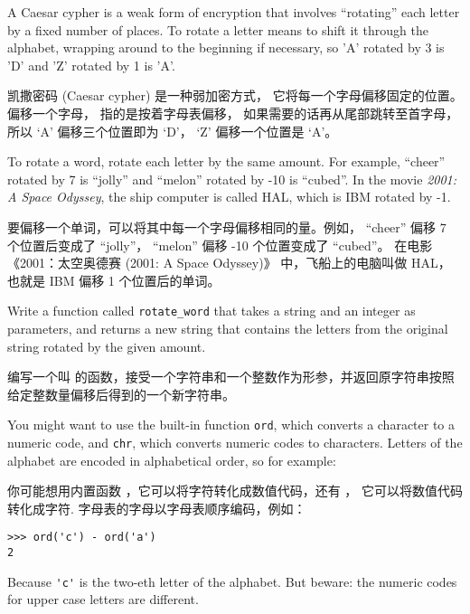 \begin{exercise}
  

\label{exrotate}
A Caesar cypher is a weak form of encryption that involves ``rotating'' each
letter by a fixed number of places.  To rotate a letter means
to shift it through the alphabet, wrapping around to the beginning if
necessary, so 'A' rotated by 3 is 'D' and 'Z' rotated by 1 is 'A'.

凯撒密码 (Caesar cypher) 是一种弱加密方式， 它将每一个字母偏移固定的位置。 偏移一个字母， 指的是按着字母表偏移， 如果需要的话再从尾部跳转至首字母， 所以 `A' 偏移三个位置即为 `D'， `Z' 偏移一个位置是 `A'。

To rotate a word, rotate each letter by the same amount.
For example, ``cheer'' rotated by 7 is ``jolly'' and ``melon'' rotated
by -10 is ``cubed''.  In the movie {\em 2001: A Space Odyssey}, the
ship computer is called HAL, which is IBM rotated by -1.

要偏移一个单词，可以将其中每一个字母偏移相同的量。例如， ``cheer'' 偏移 7 个位置后变成了 ``jolly''， ``melon'' 偏移 -10 个位置变成了 ``cubed''。 在电影 《2001：太空奥德赛 (2001: A Space Odyssey)》 中，飞船上的电脑叫做 HAL，也就是 IBM 偏移 1 个位置后的单词。


Write a function called \verb"rotate_word"
that takes a string and an integer as parameters, and returns
a new string that contains the letters from the original string
rotated by the given amount.

编写一个叫  的函数，接受一个字符串和一个整数作为形参，并返回原字符串按照给定整数量偏移后得到的一个新字符串。

You might want to use the built-in function {\tt ord}, which converts
a character to a numeric code, and {\tt chr}, which converts numeric
codes to characters.  Letters of the alphabet are encoded in alphabetical
order, so for example:

你可能想用内置函数  ，它可以将字符转化成数值代码，还有 ， 它可以将数值代码转化成字符. 字母表的字母以字母表顺序编码，例如：

\begin{lstlisting}
>>> ord('c') - ord('a')
2
\end{lstlisting}

Because \verb"'c'" is the two-eth letter of the alphabet.  But
beware: the numeric codes for upper case letters are different.


\end{exercise}
